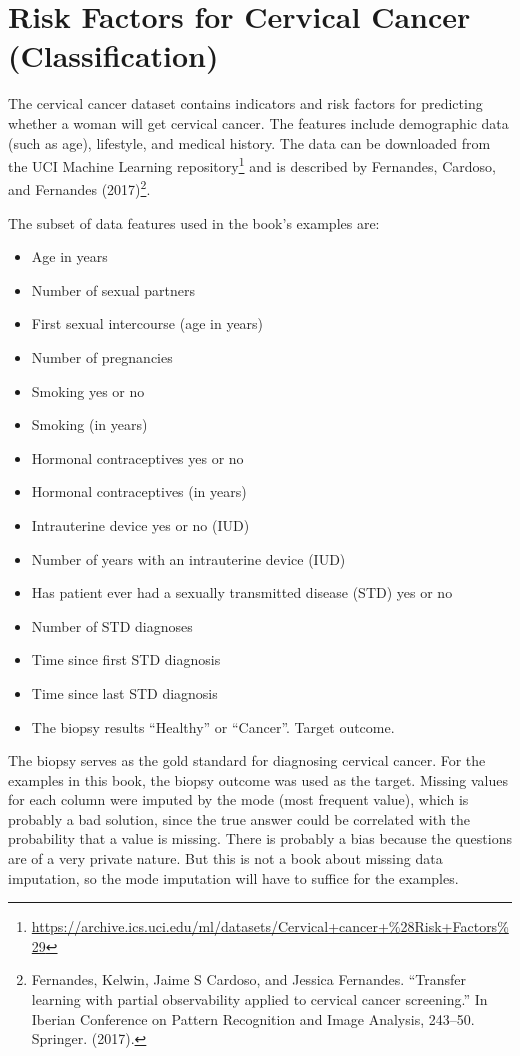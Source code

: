 \documentclass[12pt,]{krantz}
\providecommand{\tightlist}{%
  \setlength{\itemsep}{0pt}\setlength{\parskip}{0pt}}
\renewcommand{\href}[2]{#2\footnote{\url{#1}}}
\begin{document}
\hypertarget{cervical}{\section{Risk Factors for Cervical Cancer
(Classification)}\label{cervical}}

The cervical cancer dataset contains indicators and risk factors for
predicting whether a woman will get cervical cancer. The features
include demographic data (such as age), lifestyle, and medical history.
The data can be downloaded from the
\href{https://archive.ics.uci.edu/ml/datasets/Cervical+cancer+\%28Risk+Factors\%29}{UCI
Machine Learning repository} and is described by Fernandes, Cardoso, and
Fernandes (2017)\footnote{Fernandes, Kelwin, Jaime S Cardoso, and
  Jessica Fernandes. ``Transfer learning with partial observability
  applied to cervical cancer screening.'' In Iberian Conference on
  Pattern Recognition and Image Analysis, 243--50. Springer. (2017).}.

The subset of data features used in the book's examples are:

\begin{itemize}
\tightlist
\item
  Age in years
\item
  Number of sexual partners
\item
  First sexual intercourse (age in years)
\item
  Number of pregnancies
\item
  Smoking yes or no
\item
  Smoking (in years)
\item
  Hormonal contraceptives yes or no
\item
  Hormonal contraceptives (in years)
\item
  Intrauterine device yes or no (IUD)
\item
  Number of years with an intrauterine device (IUD)
\item
  Has patient ever had a sexually transmitted disease (STD) yes or no
\item
  Number of STD diagnoses
\item
  Time since first STD diagnosis
\item
  Time since last STD diagnosis
\item
  The biopsy results ``Healthy'' or ``Cancer''. Target outcome.
\end{itemize}

The biopsy serves as the gold standard for diagnosing cervical cancer.
For the examples in this book, the biopsy outcome was used as the
target. Missing values for each column were imputed by the mode (most
frequent value), which is probably a bad solution, since the true answer
could be correlated with the probability that a value is missing. There
is probably a bias because the questions are of a very private nature.
But this is not a book about missing data imputation, so the mode
imputation will have to suffice for the examples.
\end{document}
